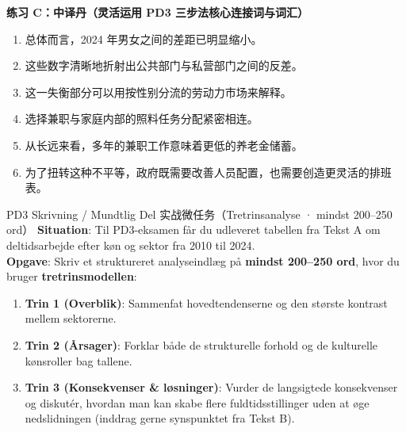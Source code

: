 \textbf{练习 C：中译丹（灵活运用 PD3 三步法核心连接词与词汇）}
\begin{enumerate}
  \item 总体而言，2024 年男女之间的差距已明显缩小。
  \item 这些数字清晰地折射出公共部门与私营部门之间的反差。
  \item 这一失衡部分可以用按性别分流的劳动力市场来解释。
  \item 选择兼职与家庭内部的照料任务分配紧密相连。
  \item 从长远来看，多年的兼职工作意味着更低的养老金储蓄。
  \item 为了扭转这种不平等，政府既需要改善人员配置，也需要创造更灵活的排班表。
\end{enumerate}


\begin{emailbox}{PD3 Skrivning / Mundtlig Del 实战微任务（Tretrinsanalyse · mindst 200--250 ord）}
\textbf{Situation}: Til PD3-eksamen får du udleveret tabellen fra Tekst A om deltidsarbejde efter køn og sektor fra 2010 til 2024.\\
\textbf{Opgave}: Skriv et struktureret analyseindlæg på \textbf{mindst 200--250 ord}, hvor du bruger \textbf{tretrinsmodellen}:
\begin{enumerate}
  \item \textbf{Trin 1 (Overblik)}: Sammenfat hovedtendenserne og den største kontrast mellem sektorerne.
  \item \textbf{Trin 2 (Årsager)}: Forklar både de strukturelle forhold og de kulturelle kønsroller bag tallene.
  \item \textbf{Trin 3 (Konsekvenser \& løsninger)}: Vurder de langsigtede konsekvenser og diskutér, hvordan man kan skabe flere fuldtidsstillinger uden at øge nedslidningen (inddrag gerne synspunktet fra Tekst B).
\end{enumerate}
\end{emailbox}

